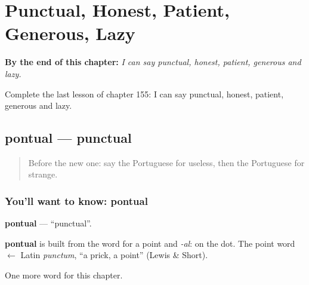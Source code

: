 
\chapter{Punctual, Honest, Patient, Generous, Lazy}
\label{ch:pt-punctual-honest-patient-generous-lazy}

\begin{chapteropening}
\textbf{By the end of this chapter:} \emph{I can say punctual, honest, patient, generous and lazy.}

Complete the last lesson of chapter 155: I can say punctual, honest, patient, generous and lazy.
\end{chapteropening}

\section[pontual]{pontual — punctual}

\label{lesson:PT-C155-pontual}



\begin{quote}
Before the new one: say the Portuguese for useless, then the Portuguese for strange.
\end{quote}

\subsection*{You'll want to know: pontual}
\textbf{pontual} — \textquotedblleft{}punctual\textquotedblright{}.

\begin{cousinweb}
\textbf{pontual} is built from the word for a point and \emph{-al}: on the dot. The point word $\leftarrow$ Latin \emph{punctum}, \textquotedblleft{}a prick, a point\textquotedblright{} (Lewis \& Short).
\end{cousinweb}

\begin{grammarlens}[title={What you've built}]
One more word for this chapter.
\end{grammarlens}

